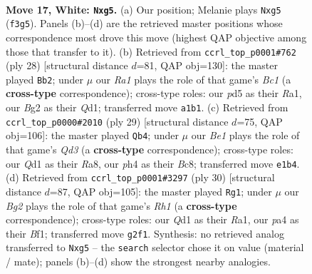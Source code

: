 \documentclass[11pt]{article}
\begin{document}
\clearpage

\begin{figure}[p]\centering
\begin{subfigure}{0.46\textwidth}\centering
\resizebox{\linewidth}{!}{%
\newchessgame
\chessboard[
  setfen={r1b1k2r/2p1qp2/2n2n2/3p2p1/pp1P2Pp/5N1P/PPK1PPB1/R2QB2R w kq - 0 17},
  showmover=false,
  pgfstyle=straightmove, color=movearrow, markmove={f3-g5}
]}
\caption{}
\end{subfigure}\hfill
\begin{subfigure}{0.46\textwidth}\centering
\resizebox{\linewidth}{!}{%
\newchessgame
\chessboard[
  setfen={4k2r/r2q1pp1/p1nbpn2/1p1p3p/1P1P4/P1N1P3/4BPPP/R1BQ1RK1 w k - 2 15},
  showmover=false,
  pgfstyle=straightmove, color=movearrow, markmove={c1-b2}
]}
\caption{}
\end{subfigure}
\\[4pt]
\begin{subfigure}{0.46\textwidth}\centering
\resizebox{\linewidth}{!}{%
\newchessgame
\chessboard[
  setfen={r1b1k2r/4bpp1/p1pq2n1/1p2p2p/4P2P/1P1PBNN1/1PPQ2P1/R3K2R b KQkq - 1 15},
  showmover=false,
  pgfstyle=straightmove, color=movearrow, markmove={d6-b4}
]}
\caption{}
\end{subfigure}\hfill
\begin{subfigure}{0.46\textwidth}\centering
\resizebox{\linewidth}{!}{%
\newchessgame
\chessboard[
  setfen={r1br2k1/p3qpb1/1pn2np1/2p4p/2P1PN1P/2N1BP2/PP3Q2/R3KB1R w KQ - 0 16},
  showmover=false,
  pgfstyle=straightmove, color=movearrow, markmove={h1-g1}
]}
\caption{}
\end{subfigure}
\caption{\textbf{Move 17, White: \texttt{Nxg5}.} (a) Our position; Melanie plays \texttt{Nxg5} (\texttt{f3g5}). Panels (b)--(d) are the retrieved master positions whose correspondence most drove this move (highest QAP objective among those that transfer to it). (b) Retrieved from \texttt{ccrl\_top\_p0001\#762} (ply 28) [structural distance $d$=81, QAP obj=130]: the master played \texttt{Bb2}; under $\mu$ our \emph{Ra1} plays the role of that game's \emph{Bc1} (a \textbf{cross-type} correspondence); cross-type roles: our \emph{p}d5 as their \emph{R}a1, our \emph{B}g2 as their \emph{Q}d1; transferred move \texttt{a1b1}. (c) Retrieved from \texttt{ccrl\_top\_p0000\#2010} (ply 29) [structural distance $d$=75, QAP obj=106]: the master played \texttt{Qb4}; under $\mu$ our \emph{Be1} plays the role of that game's \emph{Qd3} (a \textbf{cross-type} correspondence); cross-type roles: our \emph{Q}d1 as their \emph{R}a8, our \emph{p}h4 as their \emph{B}c8; transferred move \texttt{e1b4}. (d) Retrieved from \texttt{ccrl\_top\_p0001\#3297} (ply 30) [structural distance $d$=87, QAP obj=105]: the master played \texttt{Rg1}; under $\mu$ our \emph{Bg2} plays the role of that game's \emph{Rh1} (a \textbf{cross-type} correspondence); cross-type roles: our \emph{Q}d1 as their \emph{R}a1, our \emph{p}a4 as their \emph{B}f1; transferred move \texttt{g2f1}. Synthesis: no retrieved analog transferred to \texttt{Nxg5} -- the \texttt{search} selector chose it on value (material / mate); panels (b)--(d) show the strongest nearby analogies.}
\label{fig:thought-m32}
\end{figure}
\end{document}
